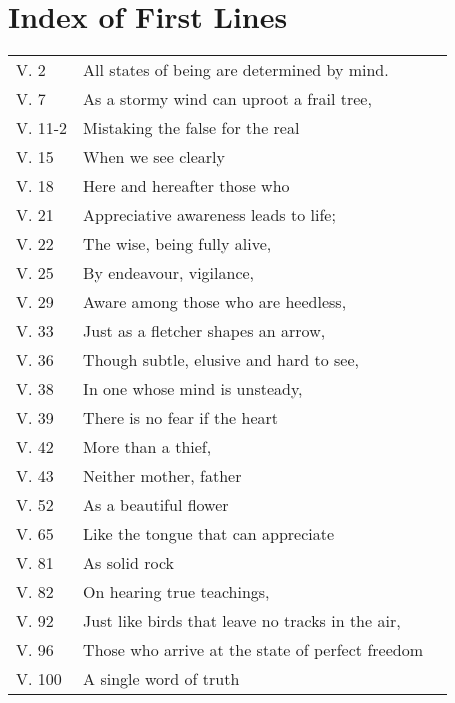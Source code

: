 
\chapter{Index of First Lines}

{\smaller
\setlength{\parskip}{0pt}
\setlength{\parindent}{0pt}

\begin{longtable}[c]{llr}
V. 2 & All states of being are determined by mind. & \pageref{dhp-2}\\
V. 7 & As a stormy wind can uproot a frail tree, & \pageref{dhp-7}\\
V. 11-2 & Mistaking the false for the real & \pageref{dhp-11}\\
V. 15 & When we see clearly & \pageref{dhp-15}\\
V. 18 & Here and hereafter those who & \pageref{dhp-18}\\
V. 21 & Appreciative awareness leads to life; & \pageref{dhp-21}\\
V. 22 & The wise, being fully alive, & \pageref{dhp-22}\\
V. 25 & By endeavour, vigilance, & \pageref{dhp-25}\\
V. 29 & Aware among those who are heedless, & \pageref{dhp-29}\\
V. 33 & Just as a fletcher shapes an arrow, & \pageref{dhp-33}\\
V. 36 & Though subtle, elusive and hard to see, & \pageref{dhp-36}\\
V. 38 & In one whose mind is unsteady, & \pageref{dhp-38}\\
V. 39 & There is no fear if the heart & \pageref{dhp-39}\\
V. 42 & More than a thief, & \pageref{dhp-42}\\
V. 43 & Neither mother, father & \pageref{dhp-43}\\
V. 52 & As a beautiful flower & \pageref{dhp-52}\\
V. 65 & Like the tongue that can appreciate & \pageref{dhp-65}\\
V. 81 & As solid rock & \pageref{dhp-81}\\
V. 82 & On hearing true teachings, & \pageref{dhp-82}\\
V. 92 & Just like birds that leave no tracks in the air, & \pageref{dhp-92}\\
V. 96 & Those who arrive at the state of perfect freedom & \pageref{dhp-96}\\
V. 100 & A single word of truth & \pageref{dhp-100}\\

\end{longtable}}
